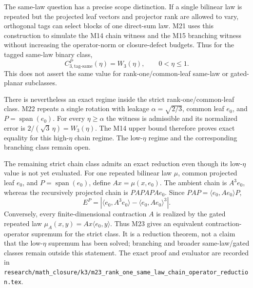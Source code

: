\documentclass[11pt]{amsart}
\theoremstyle{definition}
\theoremstyle{remark}
\begin{document}
The same-law question has a precise scope distinction. If a single bilinear
law is repeated but the projected leaf vectors and projector rank are allowed
to vary, orthogonal tags can select blocks of one direct-sum law. M21 uses
this construction to simulate the M14 chain witness and the M15 branching
witness without increasing the operator-norm or closure-defect budgets. Thus
for the tagged same-law binary class,
\[
 C_{3,\mathrm{tag\text{-}same}}^P(\eta)=W_3(\eta),
 \qquad 0<\eta\le1.
\]
This does not assert the same value for rank-one/common-leaf same-law or
gated-planar subclasses.

There is nevertheless an exact regime inside the strict rank-one/common-leaf
class. M22 repeats a single rotation with leakage
$\alpha=\sqrt{2/3}$, common leaf $e_0$, and $P=\operatorname{span}(e_0)$.
For every $\eta\ge\alpha$ the witness is admissible and its normalized error
is $2/(\sqrt3\,\eta)=W_3(\eta)$. The M14 upper bound therefore proves exact
equality for this high-$\eta$ chain regime. The low-$\eta$ regime and the
corresponding branching class remain open.

The remaining strict chain class admits an exact reduction even though its
low-$\eta$ value is not yet evaluated. For one repeated bilinear law $\mu$,
common projected leaf $e_0$, and $P=\operatorname{span}(e_0)$, define
$A x=\mu(x,e_0)$. The ambient chain is $A^3e_0$, whereas the recursively
projected chain is $PAPAPAe_0$. Since
$PAP=\langle e_0,Ae_0\rangle P$,
\[
 E^P=\left|\langle e_0,A^3e_0\rangle-
 \langle e_0,Ae_0\rangle^3\right|.
\]
Conversely, every finite-dimensional contraction $A$ is realized by the
gated repeated law $\mu_A(x,y)=Ax\langle e_0,y\rangle$. Thus M23 gives an
equivalent contraction-operator supremum for the strict class. It is a
reduction theorem, not a claim that the low-$\eta$ supremum has been solved;
branching and broader same-law/gated classes remain outside this statement.
The exact proof and evaluator are recorded in
\texttt{research/math\_closure/k3/m23\_rank\_one\_same\_law\_chain\_operator\_reduction.tex}.
\end{document}
